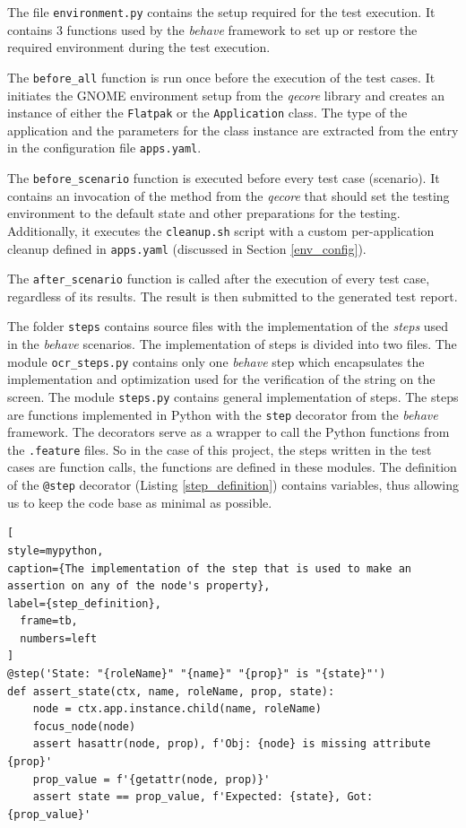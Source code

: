 The file \texttt{environment.py} contains the setup required for the test execution. It contains 3 functions used by the \textit{behave} framework to set up or restore the required environment during the test execution. 

The \texttt{before\_all} function is run once before the execution of the test cases. It initiates the GNOME environment setup from the \textit{qecore} library and creates an instance of either the \texttt{Flatpak} or the \texttt{Application} class. The type of the application and the parameters for the class instance are extracted from the entry in the configuration file \texttt{apps.yaml}. 

The \texttt{before\_scenario} function is executed before every test case (scenario). It contains an invocation of the method from the \textit{qecore} that should set the testing environment to the default state and other preparations for the testing. Additionally, it executes the \texttt{cleanup.sh} script with a custom per-application cleanup defined in \texttt{apps.yaml} (discussed in Section \ref{env_config}). 

The \texttt{after\_scenario} function is called after the execution of every test case, regardless of its results. The result is then submitted to the generated test report.

The folder \texttt{steps} contains source files with the implementation of the \textit{steps} used in the \textit{behave} scenarios. The implementation of steps is divided into two files. The module \texttt{ocr\_steps.py} contains only one \textit{behave} step which encapsulates the implementation and optimization used for the verification of the string on the screen. The module \texttt{steps.py} contains general implementation of steps. The steps are functions implemented in Python with the \texttt{step} decorator from the \textit{behave} framework. The decorators serve as a wrapper to call the Python functions from the \texttt{.feature} files. So in the case of this project, the steps written in the test cases are function calls, the functions are defined in these modules. The definition of the \texttt{@step} decorator (Listing \ref{step_definition}) contains variables, thus allowing us to keep the code base as minimal as possible.

\begin{lstlisting}[
style=mypython,
caption={The implementation of the step that is used to make an assertion on any of the node's property},
label={step_definition},
  frame=tb,
  numbers=left
]
@step('State: "{roleName}" "{name}" "{prop}" is "{state}"')
def assert_state(ctx, name, roleName, prop, state):
    node = ctx.app.instance.child(name, roleName)
    focus_node(node)
    assert hasattr(node, prop), f'Obj: {node} is missing attribute {prop}'
    prop_value = f'{getattr(node, prop)}'
    assert state == prop_value, f'Expected: {state}, Got: {prop_value}'
\end{lstlisting}

